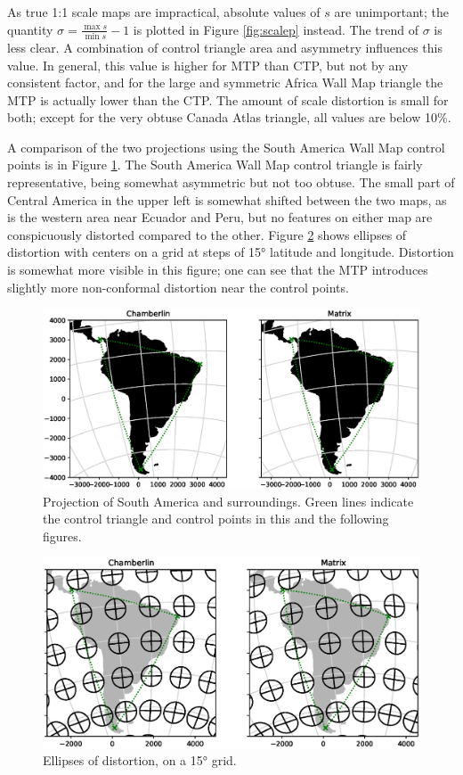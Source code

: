 \documentclass[]{interact}
\begin{document}
As true 1:1 scale maps are impractical, absolute values of $s$ are unimportant;
the quantity $\sigma = \frac{\max s}{\min s} - 1$ is plotted in Figure
\ref{fig:scalep} instead. The trend of $\sigma$ is less clear. A combination of
control triangle area and asymmetry influences this value. In general, this
value is higher for MTP than CTP, but not by any consistent factor,
and for the large and symmetric Africa Wall Map triangle the MTP is
actually lower than the CTP. The amount of scale distortion is small for both;
except for the very obtuse Canada Atlas triangle, all values are below 10\%.

A comparison of the two projections using the South America Wall Map control
points is in Figure \ref{fig:proj}.
The South America Wall Map control triangle is fairly
representative, being somewhat asymmetric but not too obtuse. The small part of
Central America in the upper left is somewhat shifted between the two maps, as
is the western area near Ecuador and Peru, but no features on either map are
conspicuously distorted compared to the other. Figure \ref{fig:tissot} shows
ellipses of distortion with centers on a grid at steps of 15° latitude and
longitude.
Distortion is somewhat more visible in this figure; one can see that the
MTP introduces slightly more non-conformal distortion near the control points.

\begin{figure}
  \includegraphics[width=\textwidth]{South_America_Wall_Map_zoom}
  \caption{Projection of South America and surroundings. Green lines indicate
  the control triangle and control points in this and the following figures.}
  \label{fig:proj}
\end{figure}

\begin{figure}
  \includegraphics[width=\textwidth]{South_America_Wall_Map_tissot}
  \caption{Ellipses of distortion, on a 15° grid.}
  \label{fig:tissot}
\end{figure}
\end{document}
